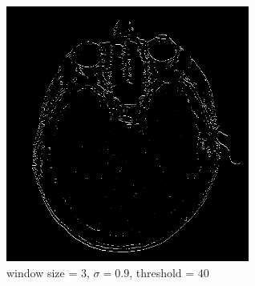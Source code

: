 \documentclass[conference]{IEEEtran}
\begin{document}
\begin{figure}[H]
\centerline{\includegraphics[width=8cm]{headCT07.png}}
\caption{window size = $3$, $\sigma=0.9$,  threshold = $40$}
\label{headCT07}
\end{figure}


\vspace{12pt}
\end{document}
